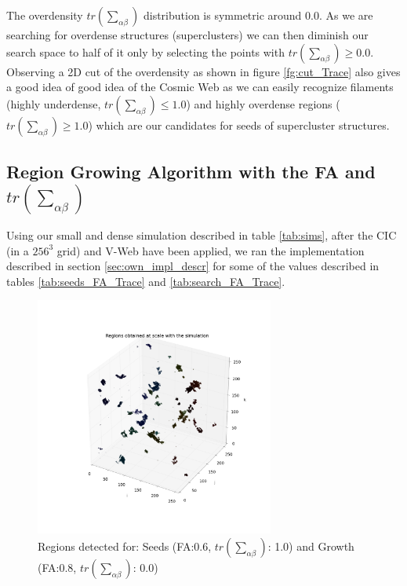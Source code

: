 \documentclass[12pt]{article}
\begin{document}
\begin{par}
The overdensity $tr \left(\sum_{\alpha\beta}\right)$ distribution is symmetric
 around 0.0. As we are searching for overdense
  structures (superclusters) we can then diminish
   our search space to half of it only by
    selecting the points with $tr \left(\sum_{\alpha\beta}\right) \geq 0.0$. \\
Observing a 2D cut of the overdensity as shown in
 figure \ref{fg:cut_Trace} also gives a good idea
  of good idea of the Cosmic Web as we can easily
   recognize filaments (highly underdense, $tr \left(\sum_{\alpha\beta}\right)
    \leq 1.0$) and highly overdense regions
     ($tr \left(\sum_{\alpha\beta}\right) \geq 1.0$) which are our candidates
      for seeds of supercluster structures.
\end{par}



\subsection{Region Growing Algorithm with the FA and $tr \left(\sum_{\alpha\beta}\right)$} \label{sec:results_own_impl}
\begin{par}
Using our small and dense simulation described in
 table \ref{tab:sims}, after the CIC (in a
  $256^3$ grid) and V-Web have been applied,
   we ran the implementation described in section
    \ref{sec:own_impl_descr} for some of the
     values described in tables
      \ref{tab:seeds_FA_Trace} and
       \ref{tab:search_FA_Trace}. 
\end{par}

\begin{figure}[ht]
\begin{center}
\includegraphics[width=0.7\textwidth]{groups/firstimplementation/regions_3D_129.png} %
\caption{Regions detected for: Seeds (FA:0.6, $tr \left(\sum_{\alpha\beta}\right)$: 1.0) and Growth (FA:0.8, $tr \left(\sum_{\alpha\beta}\right)$: 0.0) }
\label{fg:first_3D_all}
\end{center}
\end{figure}
\FloatBarrier
\end{document}
